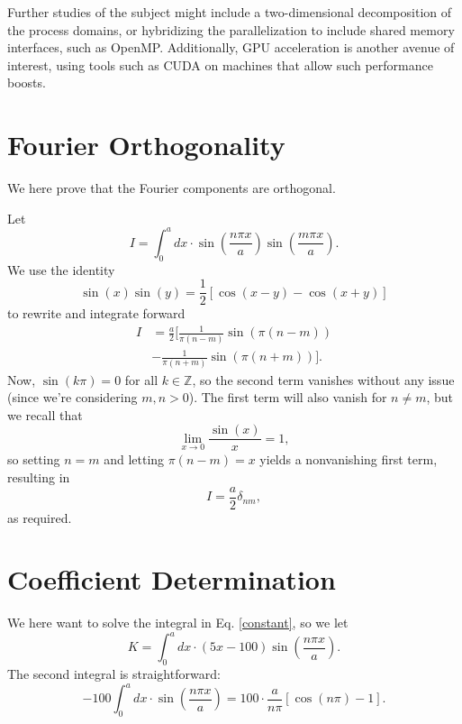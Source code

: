 \documentclass[reprint, amsmath, amssymb, aps, floatfix]{revtex4-1}
\begin{document}
Further studies of the subject might include a two-dimensional decomposition of the process domains, or hybridizing the parallelization to include shared memory interfaces, such as OpenMP. Additionally, GPU acceleration is another avenue of interest, using tools such as CUDA on machines that allow such performance boosts.



\appendix
\section{Fourier Orthogonality}

We here prove that the Fourier components are orthogonal.

Let \begin{equation}
I = \int_{0}^a dx\cdot \sin\left(\frac{n\pi x}{a}\right)\sin\left(\frac{m\pi x}{a}\right).
\end{equation} We use the identity \begin{equation}
\sin(x)\sin(y)=\frac{1}{2}\left[\cos(x-y)-\cos(x+y)\right]
\end{equation} to rewrite and integrate forward \begin{equation}
\begin{aligned}
I &= \frac{a}{2}\biggl[\frac{1}{\pi(n-m)}\sin\left(\pi(n-m)\right)\\&-\frac{1}{\pi(n+m)}\sin\left(\pi(n+m)\right)\biggr].
\end{aligned}
\end{equation} Now, $\sin(k\pi)=0$ for all $k\in\mathbb{Z}$, so the second term vanishes without any issue (since we're considering $m,n>0$). The first term will also vanish for $n\neq m$, but we recall that \begin{equation}
\lim\limits_{x\to 0} \frac{\sin(x)}{x} =1,
\end{equation} so setting $n=m$ and letting $\pi(n-m)=x$ yields a nonvanishing first term, resulting in \begin{equation}
I=\frac{a}{2} \delta_{nm},
\end{equation} as required.

\section{Coefficient Determination}
We here want to solve the integral in Eq. \eqref{constant}, so we let \begin{equation}
K = \int_0^a dx\cdot (5x-100)\sin\left(\frac{n\pi x}{a}\right).
\end{equation} The second integral is straightforward: \begin{equation}
-100\int_0^adx \cdot \sin\left(\frac{n\pi x}{a}\right) = 100\cdot \frac{a}{n\pi}\left[\cos(n\pi)-1\right].
\end{equation}
\end{document}
